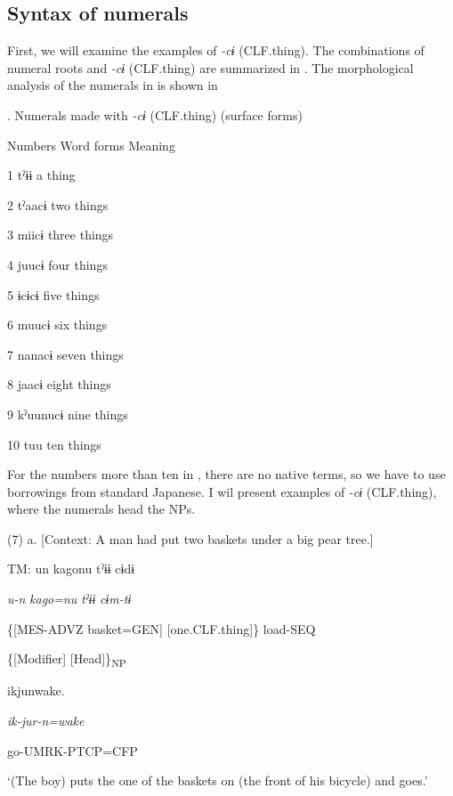 \subsection{Syntax of numerals}

First, we will examine the examples of \textit{{}-cɨ} (CLF.thing). The combinations of numeral roots and \textit{{}-cɨ} (CLF.thing) are summarized in . The morphological analysis of the numerals in  is shown in 

\begin{styleBeschriftung}
\textmd{}\textmd{. Numerals made with}\textmd{ \textit{-cɨ}}\textmd{ (CLF.thing) (surface forms)}
\end{styleBeschriftung}

Numbers  Word forms  Meaning

1  tˀɨɨ  a thing

2  tˀaacɨ  two things

3  miicɨ  three things

4  juucɨ  four things

5  ɨcɨcɨ  five things

6  muucɨ  six things

7  nanacɨ  seven things

8  jaacɨ  eight things

9  kˀuunucɨ  nine things

10  tuu  ten things

For the numbers more than ten in , there are no native terms, so we have to use borrowings from standard Japanese. I wil present examples of \textit{{}-cɨ} (CLF.thing), where the numerals head the NPs.

(7)  a.  [Context: A man had put two baskets under a big pear tree.]

    TM:  un  kagonu  tˀɨɨ  cɨdɨ

      \textit{u-n}  \textit{kago=nu}  \textit{tˀɨɨ}  \textit{cɨm-tɨ}

      \{[MES-ADVZ  basket=GEN]  [one.CLF.thing]\}  load-SEQ

      \{[Modifier]    [Head]\}\textsubscript{NP}  

      ikjunwake.

      \textit{ik-jur-n=wake}

      go-UMRK-PTCP=CFP

      ‘(The boy) puts the one of the baskets on (the front of his bicycle) and goes.’

